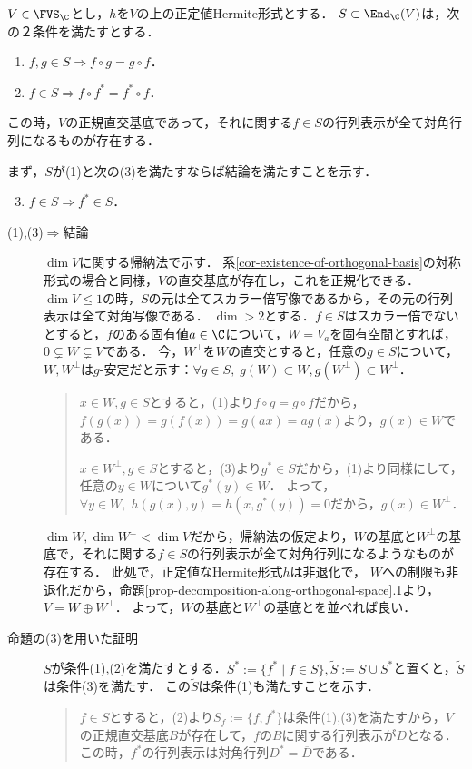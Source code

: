 \documentclass[uplatex, dvipdfmx]{jsreport}
\begin{document}
\begin{theorem}[正規直交基底による一斉対角化可能な十分条件]\label{prop-Hermite-diagonalizability}
    $V\in\FVS_\C$とし，$h$を$V$の上の正定値Hermite形式とする．
    $S\subset\End_\C(V)$は，次の２条件を満たすとする．
    \begin{enumerate}[(1)]
        \item $f,g\in S\Rightarrow f\circ g=g\circ f$．
        \item $f\in S\Rightarrow f\circ f^*=f^*\circ f$．
    \end{enumerate}
    この時，$V$の正規直交基底であって，それに関する$f\in S$の行列表示が全て対角行列になるものが存在する．
\end{theorem}
\begin{Proof}まず，$S$が(1)と次の(3)を満たすならば結論を満たすことを示す．
    \begin{enumerate}[(1)]\setcounter{enumi}{2}
        \item $f\in S\Rightarrow f^*\in S$．
    \end{enumerate}
    \begin{description}
        \item[(1),(3)$\Rightarrow$結論] 
        $\dim V$に関する帰納法で示す．
        系\ref{cor-existence-of-orthogonal-basis}の対称形式の場合と同様，$V$の直交基底が存在し，これを正規化できる．
        $\dim V\le 1$の時，$S$の元は全てスカラー倍写像であるから，その元の行列表示は全て対角写像である．
        $\dim >2$とする．$f\in S$はスカラー倍でないとすると，$f$のある固有値$a\in\C$について，$W=V_a$を固有空間とすれば，$0\subsetneq W\subsetneq V$である．
        今，$W^\perp$を$W$の直交とすると，任意の$g\in S$について，$W,W^\perp$は$g$-安定だと示す：$\forall g\in S,\;g(W)\subset W,g(W^\perp)\subset W^\perp$．
        \begin{quotation}
            $x\in W,g\in S$とすると，(1)より$f\circ g=g\circ f$だから，$f(g(x))=g(f(x))=g(ax)=ag(x)$より，$g(x)\in W$である．

            $x\in W^\perp,g\in S$とすると，(3)より$g^*\in S$だから，(1)より同様にして，任意の$y\in W$について$g^*(y)\in W$．
            よって，$\forall y\in W,\;h(g(x),y)=h(x,g^*(y))=0$だから，$g(x)\in W^\perp$．
        \end{quotation}
        $\dim W,\dim W^\perp<\dim V$だから，帰納法の仮定より，$W$の基底と$W^\perp$の基底で，それに関する$f\in S$の行列表示が全て対角行列になるようなものが存在する．
        此処で，正定値なHermite形式$h$は非退化で，
        $W$への制限も非退化だから，命題\ref{prop-decomposition-along-orthogonal-space}.1より，$V=W\oplus W^\perp$．
        よって，$W$の基底と$W^\perp$の基底とを並べれば良い．
        \item[命題の(3)を用いた証明]
        $S$が条件(1),(2)を満たすとする．$S^*:=\{f^*\mid f\in S\},\tilde{S}:=S\cup S^*$と置くと，$\tilde{S}$は条件(3)を満たす．
        この$\tilde{S}$は条件(1)も満たすことを示す．
        \begin{quotation}
            $f\in S$とすると，(2)より$S_f:=\{f,f^*\}$は条件(1),(3)を満たすから，$V$の正規直交基底$B$が存在して，$f$の$B$に関する行列表示が$D$となる．
            この時，$f^*$の行列表示は対角行列$D^*=\overline{D}$である．


\end{quotation}
\end{description}
\end{Proof}
\end{document}
